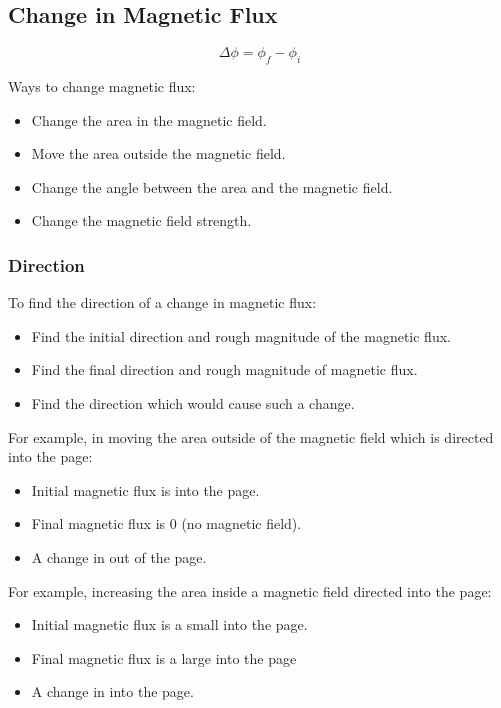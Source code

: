 \documentclass[a4paper,11pt]{report}
\begin{document}
\subsection{Change in Magnetic Flux}

$$
\Delta \phi = \phi_f - \phi_i
$$

Ways to change magnetic flux:

\begin{itemize}
\item Change the area in the magnetic field.
\item Move the area outside the magnetic field.
\item Change the angle between the area and the magnetic field.
\item Change the magnetic field strength.
\end{itemize}

\subsubsection{Direction}

To find the direction of a change in magnetic flux:

\begin{itemize}
\item Find the initial direction and rough magnitude of the magnetic flux.
\item Find the final direction and rough magnitude of magnetic flux.
\item Find the direction which would cause such a change.
\end{itemize}

For example, in moving the area outside of the magnetic field which is directed
into the page:

\begin{itemize}
\item Initial magnetic flux is into the page.
\item Final magnetic flux is 0 (no magnetic field).
\item A change in out of the page.
\end{itemize}

For example, increasing the area inside a magnetic field directed into the
page:

\begin{itemize}
\item Initial magnetic flux is a small into the page.
\item Final magnetic flux is a large into the page
\item A change in into the page.
\end{itemize}
\end{document}
